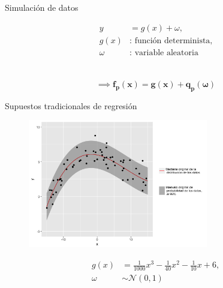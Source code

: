 \documentclass{beamer}
\begin{document}
\begin{frame}{Simulaci\'on de datos}
\begin{block}{}
    \begin{equation*}
    \begin{aligned}
        y &= g(x) + \omega,\\
        g(x) &: \text{ funci\'on determinista,} \\
        \omega &: \text{ variable aleatoria}
    \end{aligned}
    \end{equation*}
    \\~\\
    \begin{equation*}
        \implies \bm{f_p(x) = g(x) + q_p(\omega)}
    \end{equation*}
\end{block}
\end{frame}

\begin{frame}{Supuestos tradicionales de regresi\'on}
    \begin{figure}[H]
        	\centering
        	\includegraphics[width=0.7\textwidth]{Figures/Simulation/classic/sample.png}
        	\label{sample_classic}
    \end{figure}
    \begin{equation*}
    \begin{aligned}
        g(x) &= \frac{1}{1000}x^3 - \frac{1}{40}x^2 - \frac{1}{10}x + 6,\\
        \omega &\sim \mathcal{N}(0,1)
    \end{aligned}
    \end{equation*}
\end{frame}
\end{document}
